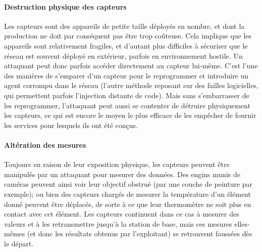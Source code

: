         \paragraph{Destruction physique des capteurs}
Les capteurs sont des appareils de petite taille déployés en nombre, et dont la production ne doit par conséquent pas être trop coûteuse.
Cela implique que les appareils sont relativement fragiles, et d'autant plus difficiles à sécuriser que le réseau est souvent déployé en extérieur, parfois en environnement hostile.
Un attaquant peut donc parfois accéder directement au capteur lui-même.
C'est l'une des manières de s'emparer d'un capteur pour le reprogrammer et introduire un agent corrompu dans le réseau (l'autre méthode reposant sur des failles logicielles, qui permettent parfois l'injection distante de code).
Mais sans s'embarrasser de les reprogrammer, l'attaquant peut aussi se contenter de détruire physiquement les capteurs, ce qui est encore le moyen le plus efficace de les empêcher de fournir les services pour lesquels ils ont été conçus.

        \paragraph{Altération des mesures}
Toujours en raison de leur exposition physique, les capteurs peuvent être manipulés par un attaquant pour mesurer des données.
Des engins munis de caméras peuvent ainsi voir leur objectif obstrué (par une couche de peinture par exemple); ou bien des capteurs chargés de mesurer la température d'un élément donné peuvent être déplacés, de sorte à ce que leur thermomètre ne soit plus en contact avec cet élément.
Les capteurs continuent dans ce cas à mesurer des valeurs et à les retransmettre jusqu'à la station de base, mais ces mesures elles-mêmes (et donc les résultats obtenus par l'exploitant) se retrouvent faussées dès le départ.

